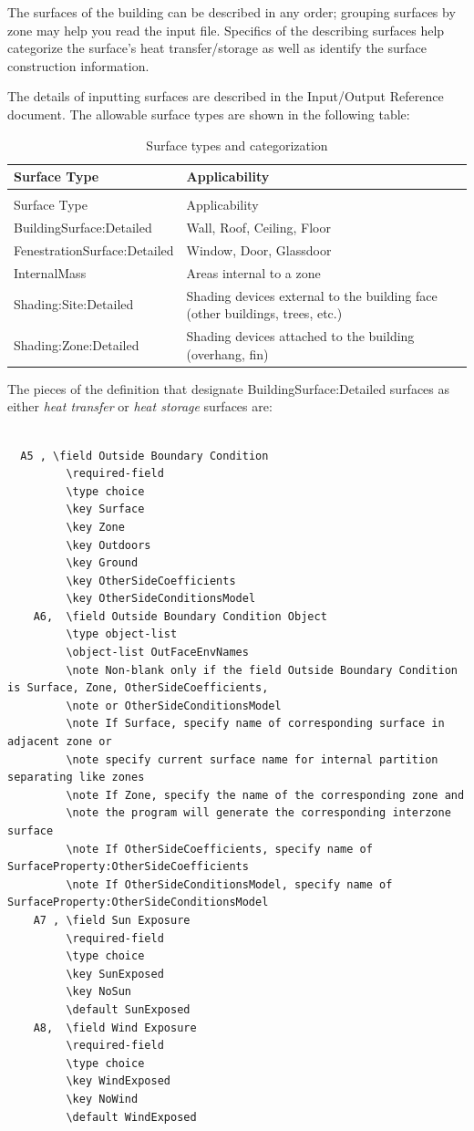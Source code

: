 The surfaces of the building can be described in any order; grouping surfaces by zone may help you read the input file. Specifics of the describing surfaces help categorize the surface's heat transfer/storage as well as identify the surface construction information.

The details of inputting surfaces are described in the Input/Output Reference document. The allowable surface types are shown in the following table:

\begin{longtable}[c]{p{1.61in}p{4.38in}}
\caption{Surface types and categorization \label{table:surface-types-and-categorization}} \tabularnewline
\toprule 
Surface Type & Applicability \tabularnewline
\midrule
\endfirsthead

\caption[]{Surface types and categorization} \tabularnewline
\toprule 
Surface Type & Applicability \tabularnewline
\midrule
\endhead

BuildingSurface:Detailed & Wall, Roof, Ceiling, Floor \tabularnewline
FenestrationSurface:Detailed & Window, Door, Glassdoor \tabularnewline
InternalMass & Areas internal to a zone \tabularnewline
Shading:Site:Detailed & Shading devices external to the building face (other buildings, trees, etc.) \tabularnewline
Shading:Zone:Detailed & Shading devices attached to the building (overhang, fin) \tabularnewline
\bottomrule
\end{longtable}

The pieces of the definition that designate BuildingSurface:Detailed surfaces as either \emph{heat transfer} or \emph{heat storage} surfaces are:

\begin{lstlisting}

  A5 , \field Outside Boundary Condition
         \required-field
         \type choice
         \key Surface
         \key Zone
         \key Outdoors
         \key Ground
         \key OtherSideCoefficients
         \key OtherSideConditionsModel
    A6,  \field Outside Boundary Condition Object
         \type object-list
         \object-list OutFaceEnvNames
         \note Non-blank only if the field Outside Boundary Condition is Surface, Zone, OtherSideCoefficients,
         \note or OtherSideConditionsModel
         \note If Surface, specify name of corresponding surface in adjacent zone or
         \note specify current surface name for internal partition separating like zones
         \note If Zone, specify the name of the corresponding zone and
         \note the program will generate the corresponding interzone surface
         \note If OtherSideCoefficients, specify name of SurfaceProperty:OtherSideCoefficients
         \note If OtherSideConditionsModel, specify name of SurfaceProperty:OtherSideConditionsModel
    A7 , \field Sun Exposure
         \required-field
         \type choice
         \key SunExposed
         \key NoSun
         \default SunExposed
    A8,  \field Wind Exposure
         \required-field
         \type choice
         \key WindExposed
         \key NoWind
         \default WindExposed
\end{lstlisting}

